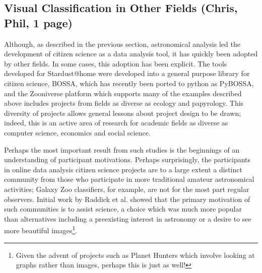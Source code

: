 \documentclass{ar2e}
\begin{document}


\subsection{Visual Classification in Other Fields (\textbf{Chris}, Phil, 1 page)}
\label{sec:class:non-astro}

Although, as described in the previous section, astronomical analysis led the development of citizen science as a data analysis tool, it has quickly been adopted by other fields. In some cases, this adoption has been explicit. The tools developed for Stardust@home were developed into a general purpose library for citizen science, BOSSA, which has recently been ported to python as PyBOSSA, and the Zooniverse platform which supports many of the examples described above includes projects from fields as diverse as ecology and papyrology. This diversity of projects allows general lessons about project design to be drawn; indeed, this is an active area of research for academic fields as diverse as computer science, economics and social science. 


Perhaps the most important result from such studies is the beginnings of an understanding of participant motivations. Perhaps surprisingly, the participants in online data analysis citizen science projects are to a large extent a distinct community from those who participate in more traditional amateur astronomical activities; Galaxy Zoo classifiers, for example, are not for the most part regular observers. Initial work by Raddick et al. showed that the primary motivation of such communities is to assist science, a choice which was much more popular than alternatives including a preexisting interest in astronomy or a desire to see more beautiful images\footnote{Given the advent of projects such as Planet Hunters which involve looking at graphs rather than images, perhaps this is just as well!}. 
\end{document}
